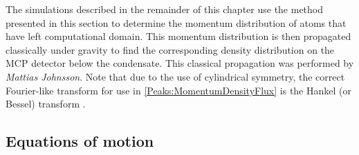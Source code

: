 \parasep

The simulations described in the remainder of this chapter use the method presented in this section to determine the momentum distribution of atoms that have left computational domain. This momentum distribution is then propagated classically under gravity to find the corresponding density distribution on the MCP detector below the condensate. This classical propagation was performed by \emph{Mattias Johnsson}. Note that due to the use of cylindrical symmetry, the correct Fourier-like transform for use in \eqref{Peaks:MomentumDensityFlux} is the Hankel (or Bessel) transform \citep{ArfkenWeber}.

\subsection{Equations of motion}
\label{Peaks:3DEquationsOfMotion}

